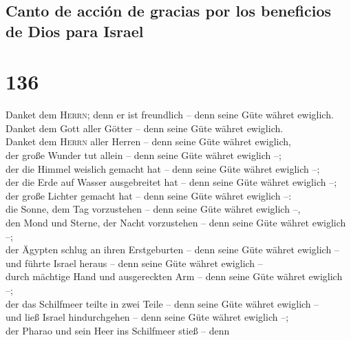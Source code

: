 \hypertarget{canto-de-acciuxf3n-de-gracias-por-los-beneficios-de-dios-para-israel}{%
\subsection{Canto de acción de gracias por los beneficios de Dios para
Israel}\label{canto-de-acciuxf3n-de-gracias-por-los-beneficios-de-dios-para-israel}}

\hypertarget{section-135}{%
\section{136}\label{section-135}}

 Danket dem \textsc{Herrn}; denn er ist freundlich -- denn
seine Güte währet ewiglich.\\
 Danket dem Gott aller Götter -- denn seine Güte währet
ewiglich.\\
 Danket dem \textsc{Herrn} aller Herren -- denn seine Güte
währet ewiglich,\\
 der große Wunder tut allein -- denn seine Güte währet
ewiglich --;\\
 der die Himmel weislich gemacht hat -- denn seine Güte
währet ewiglich --;\\
 der die Erde auf Wasser ausgebreitet hat -- denn seine
Güte währet ewiglich --;\\
 der große Lichter gemacht hat -- denn seine Güte währet
ewiglich --:\\
 die Sonne, dem Tag vorzustehen -- denn seine Güte währet
ewiglich --,\\
 den Mond und Sterne, der Nacht vorzustehen -- denn seine
Güte währet ewiglich --;\\
 der Ägypten schlug an ihren Erstgeburten -- denn seine
Güte währet ewiglich --\\
 und führte Israel heraus -- denn seine Güte währet
ewiglich --\\
 durch mächtige Hand und ausgereckten Arm -- denn seine
Güte währet ewiglich --;\\
 der das Schilfmeer teilte in zwei Teile -- denn seine
Güte währet ewiglich --\\
 und ließ Israel hindurchgehen -- denn seine Güte währet
ewiglich --;\\
 der Pharao und sein Heer ins Schilfmeer stieß -- denn
